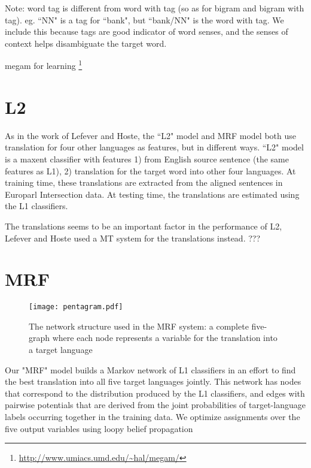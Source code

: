 \documentclass[11pt,letterpaper]{article}
\begin{document}
Note: word tag is different from word with tag (so as for bigram and bigram
with tag). eg. ``NN" is a tag for ``bank", but ``bank/NN" is the word with tag.
We include this because tags are good indicator of word senses, and the senses
of context helps disambiguate the target word. 

megam for learning \footnote{\url{http://www.umiacs.umd.edu/~hal/megam/}}
\cite{daume04cg-bfgs}
\section{L2}
As in the work of Lefever and Hoste, the ``L2" model and MRF model both use
translation for four other languages as features, but in different ways.  ``L2"
model is a maxent classifier with features 1) from English source sentence (the
same features as L1), 2) translation for the target word into other four
languages.  At training time, these translations are extracted from the aligned
sentences in Europarl Intersection data.  At testing time, the translations are
estimated using the L1 classifiers. 

The translations seems to be an important factor in the performance of L2,
Lefever and Hoste used a MT system for the translations instead.
???


\section{MRF}
\begin{figure}
  \begin{center}
  \texttt{[image: pentagram.pdf]}
  \end{center}
  \label{pentagram}
  \caption{The network structure used in the MRF system: a complete five-graph
  where each node represents a variable for the translation into a target
language}
\end{figure}
Our "MRF" model builds a Markov network of L1 classifiers in an effort to find
the best translation into all five target languages jointly. This network has
nodes that correspond to the distribution produced by the L1 classifiers, and
edges with pairwise potentials that are derived from the joint probabilities of
target-language labels occurring together in the training data. We optimize
assignments over the five output variables using loopy belief propagation
\end{document}
